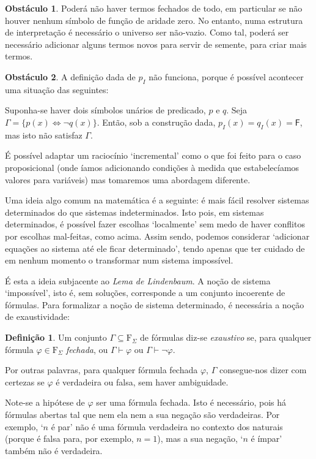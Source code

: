 \documentclass{report}
\theoremstyle{definition}
\newtheorem{definicao}{Definição}
\newtheorem{obstaculo}{Obstáculo}
\theoremstyle{remark}
\newcommand{\F}{\mathrm{F}}
\newcommand{\lf}{\mathsf{F}}
\newcommand{\eqv}{\mathbin{\Leftrightarrow}}
\begin{document}
	\begin{obstaculo}
	Poderá não haver termos fechados de todo, em particular se não houver nenhum símbolo de função de aridade zero. No entanto, numa estrutura de interpretação é necessário o universo ser não-vazio. Como tal, poderá ser necessário adicionar alguns termos novos para servir de semente, para criar mais termos.
	\end{obstaculo}
	
	\begin{obstaculo}
	A definição dada de $p_I$ não funciona, porque é possível acontecer uma situação das seguintes:
	
	Suponha-se haver dois símbolos unários de predicado, $p$ e $q$. Seja $\Gamma = \{p(x) \eqv \neg q(x)\}$. Então, sob a construção dada, $p_I(x) = q_I(x) = \lf$, mas isto não satisfaz $\Gamma$.
	
	É possível adaptar um raciocínio `incremental' como o que foi feito para o caso proposicional (onde íamos adicionando condições à medida que estabelecíamos valores para variáveis) mas tomaremos uma abordagem diferente.
	\end{obstaculo}
	
	Uma ideia algo comum na matemática é a seguinte: é mais fácil resolver sistemas determinados do que sistemas indeterminados. Isto pois, em sistemas determinados, é possível fazer escolhas `localmente' sem medo de haver conflitos por escolhas mal-feitas, como acima. Assim sendo, podemos considerar `adicionar equações ao sistema até ele ficar determinado', tendo apenas que ter cuidado de em nenhum momento o transformar num sistema impossível.
	
	É esta a ideia subjacente ao \emph{Lema de Lindenbaum}. A noção de sistema `impossível', isto é, sem soluções, corresponde a um conjunto incoerente de fórmulas. Para formalizar a noção de sistema determinado, é necessária a noção de exaustividade:
	
	\begin{definicao}
	Um conjunto $\Gamma \subseteq \F_\Sigma$ de fórmulas diz-se \emph{exaustivo} se, para qualquer fórmula $\varphi \in \F_\Sigma$ \emph{fechada}, ou $\Gamma \vdash \varphi$ ou $\Gamma \vdash \neg \varphi$.
	\end{definicao}
	
	Por outras palavras, para qualquer fórmula fechada $\varphi$, $\Gamma$ consegue-nos dizer com certezas se $\varphi$ é verdadeira ou falsa, sem haver ambiguidade.
	
	Note-se a hipótese de $\varphi$ ser uma fórmula fechada. Isto é necessário, pois há fórmulas abertas tal que nem ela nem a sua negação são verdadeiras. Por exemplo, `$n$ é par' não é uma fórmula verdadeira no contexto dos naturais (porque é falsa para, por exemplo, $n = 1$), mas a sua negação, `$n$ é ímpar' também não é verdadeira.
	
\end{document}
